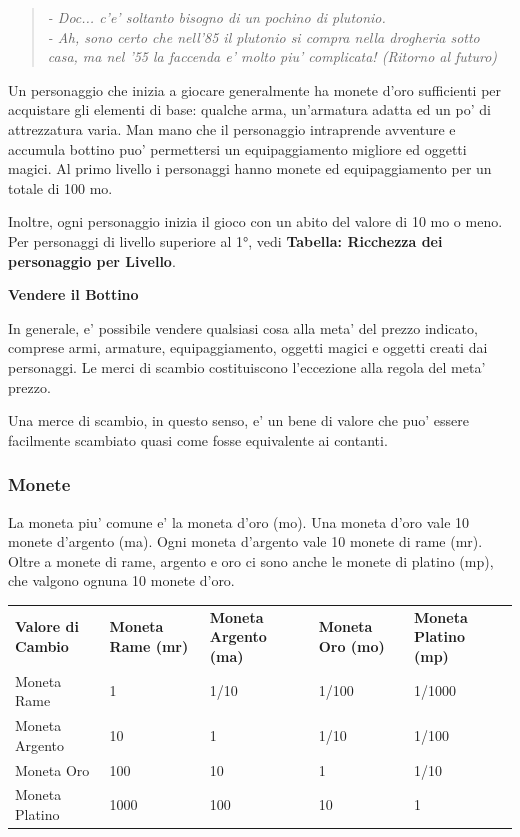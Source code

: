 \documentclass[a4paper,11pt,twoside,openany]{book}
\begin{document}
{\begin{quote}\textit{
- Doc... c'e' soltanto bisogno di un pochino di plutonio.\\
- Ah, sono certo che nell'85 il plutonio si compra nella drogheria sotto casa, ma nel '55 la faccenda e' molto piu' complicata! (Ritorno al futuro)
}\end{quote}


\label{ricchezza-e-denaro}

Un personaggio che inizia a giocare generalmente ha monete d'oro sufficienti per acquistare gli elementi di base: qualche arma, un'armatura adatta ed un po' di attrezzatura varia. Man mano che il personaggio intraprende avventure e accumula bottino puo' permettersi un equipaggiamento migliore ed oggetti magici. Al primo livello i personaggi hanno monete ed equipaggiamento per un totale di 100 mo.

Inoltre, ogni personaggio inizia il gioco con un abito del valore di 10 mo o meno. Per personaggi di livello superiore al 1°, vedi \textbf{Tabella: Ricchezza dei personaggio per Livello}.

\textbf{Vendere il Bottino}

In generale, e' possibile vendere qualsiasi cosa alla meta' del prezzo indicato, comprese armi, armature, equipaggiamento, oggetti magici e oggetti creati dai personaggi. Le merci di scambio costituiscono l'eccezione alla regola del meta' prezzo.

Una merce di scambio, in questo senso, e' un bene di valore che puo' essere facilmente scambiato quasi come fosse equivalente ai contanti.

\bigskip

\subsubsection{Monete}

La moneta piu' comune e' la moneta d'oro (mo). Una moneta d'oro vale 10 monete d'argento (ma). Ogni moneta d'argento vale 10 monete di rame (mr). Oltre a monete di rame, argento e oro ci sono anche le monete di platino (mp), che valgono ognuna 10 monete d'oro.

\begin{tabular}{L{3cm} L{3cm} L{3cm} L{3cm} L{3cm}}
\toprule
\textbf{Valore di Cambio} & \textbf{Moneta Rame (mr)} & \textbf{Moneta Argento (ma)} & \textbf{Moneta Oro (mo)} & \textbf{Moneta Platino (mp)}\tabularnewline
Moneta Rame & 1 & 1/10 & 1/100 & 1/1000\tabularnewline
Moneta Argento & 10 & 1 & 1/10 & 1/100\tabularnewline
Moneta Oro & 100 & 10 & 1 & 1/10\tabularnewline
Moneta Platino & 1000 & 100 & 10 & 1\tabularnewline
\end{tabular}

}
\end{document}
